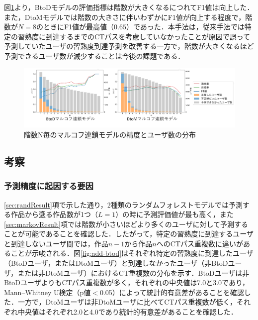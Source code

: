 \documentclass[submit]{ipsj}
\newcommand{\todo}[1]{\colorbox{yellow}{{\bf TODO}:}{\color{red} {\textbf{[#1]}}}}
\begin{document}
図\ref{fig:markov-btod}より，BtoDモデルの評価指標は階数が大きくなるにつれてF1値は向上した．また，DtoMモデルでは階数の大きさに伴いわずかにF1値が向上する程度で，階数が$N=8$のときにF1値が最高値（$0.65$）であった．本手法は，従来手法では特定の習熟度に到達するまでのCTパスを考慮していなかったことが原因で誤って予測していたユーザの習熟度到達予測を改善する一方で，階数が大きくなるほど予測できるユーザ数が減少することは今後の課題である．


\begin{figure}[t]
	\centering
	\includegraphics[width=0.9\linewidth]{Okamoto_fig/markov-result.pdf}
        \vspace{-5mm}
	\caption{階数N毎のマルコフ連鎖モデルの精度とユーザ数の分布}
	\label{fig:markov-btod}
 \vspace{-4mm}
\end{figure}


\vspace{-5mm}
\subsection{考察}


\subsubsection{予測精度に起因する要因}

\ref{sec:randResult}項で示した通り，2種類のランダムフォレストモデルでは予測する作品から遡る作品数が1つ（$L=1$）の時に予測評価値が最も高く，また\ref{sec:markovResult}項では階数が小さいほどより多くのユーザに対して予測することが可能であることを確認した．したがって，特定の習熟度に到達するユーザと到達しないユーザ間では，作品$n-1$から作品$n$へのCTパス重複数に違いがあることが示唆される．図\ref{fig:add-btod}はそれぞれ特定の習熟度に到達したユーザ（BtoDユーザ，またはDtoMユーザ）と到達しなかったユーザ（非BtoDユーザ，または非DtoMユーザ）におけるCT重複数の分布を示す．BtoDユーザは非BtoDユーザよりもCTパス重複数が多く，それぞれの中央値は7.0と3.0であり，Mann–Whitney U検定（p値$<$0.05）によって統計的有意差があることを確認した．一方で，DtoMユーザは非DtoMユーザに比べてCTパス重複数が低く，それぞれ中央値はそれぞれ2.0と4.0であり統計的有意差があることを確認した．
\end{document}
